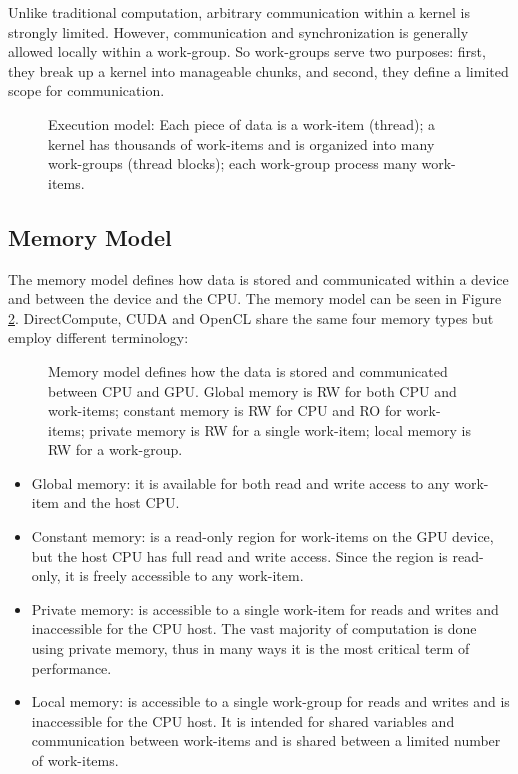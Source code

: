 \documentclass{comjnl}
\begin{document}
Unlike traditional computation, arbitrary communication within a kernel is strongly limited. However, communication and synchronization is generally allowed locally within a work-group. So work-groups serve two purposes: first, they break up a kernel into manageable chunks, and second, they define a limited scope for communication. 

\begin{figure}[h]
\centerline{}
\caption{Execution model: Each piece of data is a work-item (thread); a kernel has thousands of work-items and is organized into many work-groups (thread blocks); each work-group process many work-items.}
\label{figure:grid}
\end{figure}

\subsection{Memory Model}

The memory model defines how data is stored and communicated within a device and between the device and the CPU. The memory model can be seen in Figure \ref{figure:memory}. DirectCompute, CUDA and OpenCL share the same four memory types but employ different terminology:

\begin{figure}
\centerline{}
\caption{Memory model defines how the data is stored and communicated between CPU and GPU. Global memory is RW for both CPU and work-items; constant memory is RW for CPU and RO for work-items; private memory is RW for a single work-item; local memory is RW for a work-group.}
\label{figure:memory}
\end{figure}

\begin{itemize}
\item Global memory: it is available for both read and write access to any work-item and the host CPU.
\item Constant memory: is a read-only region for work-items on the GPU device, but the host CPU has full read and write access. Since the region is read-only, it is freely accessible to any work-item.
\item Private memory: is accessible to a single work-item for reads and writes and inaccessible for the CPU host. The vast majority of computation is done using private memory, thus in many ways it is the most critical term of performance.
\item Local memory: is accessible to a single work-group for reads and writes and is inaccessible for the CPU host. It is intended for shared variables and communication between work-items and is shared between a limited number of work-items.
\end{itemize} 
\end{document}
